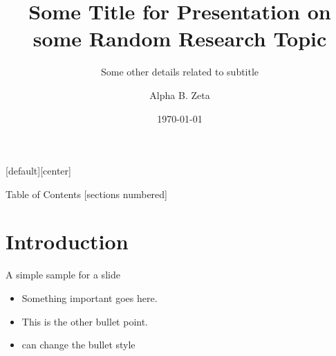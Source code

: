 \documentclass[10pt,xcolor=table]{beamer}
\title[A shorter title]{Some Title for Presentation on some Random Research Topic}
\subtitle[test]{Some other details related to subtitle}
\date{\today}
\author[alphazeta@bu.edu]{Alpha B. Zeta}
\institute[SPTL, BU]{Center for Space Physics, Boston University}
\begin{document}
    {
    \maketitle
    }

[default][center]

\begin{frame}[plain]{Table of Contents}
    [sections numbered]
    \tableofcontents[currentsubsection,sectionstyle=show,subsectionstyle=show/shaded]
\end{frame}

\section[Intro]{Introduction}
    \begin{frame}{A simple sample for a slide}
        \begin{itemize}
            \item Something important goes here.
            \item This is the other bullet point.
            \item can change the bullet style
        \end{itemize}
    \end{frame}
    
\end{document}
